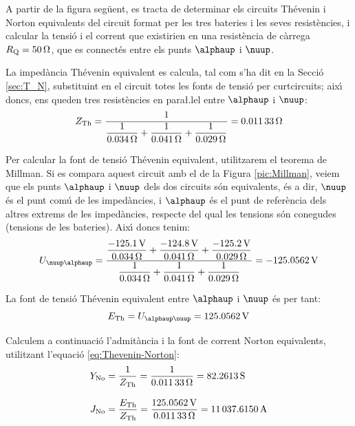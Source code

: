 \begin{exemple}
    A partir de la figura seg\"{u}ent, es tracta de determinar els circuits
    Th\'{e}venin i Norton equivalents del circuit format per les tres
    bateries i les seves resist\`{e}ncies, i calcular la tensi\'{o} i el
    corrent que existirien en una resist\`{e}ncia de c\`{a}rrega
    $R_\mathrm{Q}=\SI{50}{\ensuremath{\mathrm{\Omega}}}$, que es connect\'{e}s entre els punts $\alphaup$
    i $\nuup$.

    \begin{center}
        
    \end{center}

    La imped\`{a}ncia Th\'{e}venin equivalent es calcula, tal com s'ha dit en la Secci\'{o} \ref{sec:T_N},
    substituint en el circuit totes les fonts de tensi\'{o} per curtcircuits; aix\'{\i} doncs, ens
    queden tres resist\`{e}ncies en para{\l.l}el entre $\alphaup$ i $\nuup$:
    \[
    Z_\mathrm{Th} = \frac{1}{\dfrac{1}{\SI{0,034}{\ensuremath{\mathrm{\Omega}}}} +
    \dfrac{1}{\SI{0,041}{\ensuremath{\mathrm{\Omega}}}} + \dfrac{1}{\SI{0,029}{\ensuremath{\mathrm{\Omega}}}}} =
    \SI{0,01133}{\ensuremath{\mathrm{\Omega}}}
    \]

    Per calcular la font de tensi\'{o} Th\'{e}venin equivalent, utilitzarem el
    teorema de Millman. Si es compara aquest circuit amb el de la Figura
    \vref{pic:Millman}, veiem que els punts $\alphaup$ i $\nuup$ dels dos
    circuits s\'{o}n equivalents, \'{e}s a dir, $\nuup$ \'{e}s el punt com\'{u} de les
    imped\`{a}ncies, i $\alphaup$ \'{e}s el punt de refer\`{e}ncia dels altres extrems
    de les imped\`{a}ncies, respecte del qual les tensions s\'{o}n conegudes
    (tensions de les bateries). Aix\'{\i} doncs tenim:
    \[
    U_{\nuup\alphaup} = \frac{\dfrac{\SI{-125,1}{V}}{\SI{0,034}{\ohm}} +
    \dfrac{\SI{-124,8}{V}}{\SI{0,041}{\ohm}} +
    \dfrac{\SI{-125,2}{V}}{\SI{0,029}{\ohm}}}{\dfrac{1}{\SI{0,034}{\ohm}}
    + \dfrac{1}{\SI{0,041}{\ohm}} + \dfrac{1}{\SI{0,029}{\ohm}}} =
    \SI{-125,0562}{V}
    \]

    La font de tensi\'{o}  Th\'{e}venin equivalent entre $\alphaup$ i $\nuup$ \'{e}s per
    tant:
    \[
    E\ped{Th} = U_{\alphaup\nuup} = \SI{125,0562}{V}
    \]

    Calculem a continuaci\'{o} l'admit\`{a}ncia i la font de corrent  Norton equivalents, utilitzant
    l'equaci\'{o} \eqref{eq:Thevenin-Norton}:
    \begin{align*}
        Y_\mathrm{No} &= \frac{1}{Z_\mathrm{Th}} = \frac{1}{\SI{0,01133}{\ensuremath{\mathrm{\Omega}}}} = \SI{82,2613}{S}
        \\[2ex]
        J_\mathrm{No} &= \frac{E_\mathrm{Th}}{Z_\mathrm{Th}} =
        \frac{\SI{125,0562}{V}}{\SI{0,01133}{\ensuremath{\mathrm{\Omega}}}}= \SI{11037,6150}{A}
    \end{align*}


\end{exemple}
